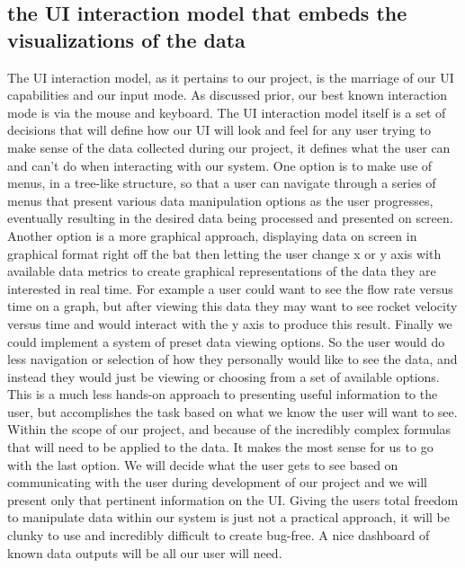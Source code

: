 \documentclass[10pt,draftclsnofoot,onecolumn]{IEEEtran}
\begin{document}
\subsection{the UI interaction model that embeds the visualizations of the data}
The UI interaction model, as it pertains to our project, is the marriage of our UI capabilities and our input mode. As discussed prior, our best known interaction mode is via the mouse and keyboard. The UI interaction model itself is a set of decisions that will define how our UI will look and feel for any user trying to make sense of the data collected during our project, it defines what the user can and can't do when interacting with our system.
One option is to make use of menus, in a tree-like structure, so that a user can navigate through a series of menus that present various data manipulation options as the user progresses, eventually resulting in the desired data being processed and presented on screen.
Another option is a more graphical approach, displaying data on screen in graphical format right off the bat then letting the user change x or y axis with available data metrics to create graphical representations of the data they are interested in real time. For example a user could want to see the flow rate versus time on a graph, but after viewing this data they may want to see rocket velocity versus time and would interact with the y axis to produce this result.
Finally we could implement a system of preset data viewing options. So the user would do less navigation or selection of how they personally would like to see the data, and instead they would just be viewing or choosing from a set of available options. This is a much less hands-on approach to presenting useful information to the user, but accomplishes the task based on what we know the user will want to see.
Within the scope of our project, and because of the incredibly complex formulas that will need to be applied to the data. It makes the most sense for us to go with the last option. We will decide what the user gets to see based on communicating with the user during development of our project and we will present only that pertinent information on the UI. Giving the users total freedom to manipulate data within our system is just not a practical approach, it will be clunky to use and incredibly difficult to create bug-free. A nice dashboard of known data outputs will be all our user will need.
\end{document}
